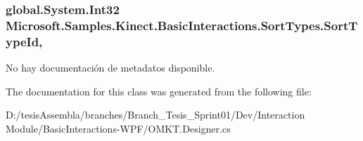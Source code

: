 \hypertarget{class_microsoft_1_1_samples_1_1_kinect_1_1_basic_interactions_1_1_sort_types_a9bdd647541e70753c17aa5139a7a0722}{
\subsubsection[{Sort\-Type\-Id}]{\setlength{\rightskip}{0pt plus 5cm}global.\-System.\-Int32 Microsoft.\-Samples.\-Kinect.\-Basic\-Interactions.\-Sort\-Types.\-Sort\-Type\-Id\hspace{0.3cm}{\ttfamily [get]}, {\ttfamily [set]}}}\label{class_microsoft_1_1_samples_1_1_kinect_1_1_basic_interactions_1_1_sort_types_a9bdd647541e70753c17aa5139a7a0722}


No hay documentación de metadatos disponible. 



The documentation for this class was generated from the following file\-:\begin{DoxyCompactItemize}
\item 
D\-:/tesis\-Assembla/branches/\-Branch\-\_\-\-Tesis\-\_\-\-Sprint01/\-Dev/\-Interaction Module/\-Basic\-Interactions-\/\-W\-P\-F/O\-M\-K\-T.\-Designer.\-cs\end{DoxyCompactItemize}
